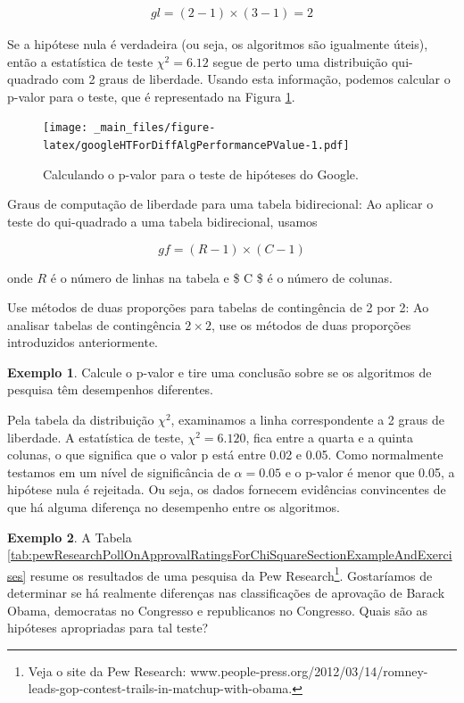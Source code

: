 \documentclass[
]{book}
\theoremstyle{definition}
\theoremstyle{definition}
\newtheorem{example}{Exemplo}[chapter]
\theoremstyle{definition}
\theoremstyle{definition}
\theoremstyle{remark}
\begin{document}
\begin{align*}
gl = (2-1)\times (3-1) = 2
\end{align*}

Se a hipótese nula é verdadeira (ou seja, os algoritmos são igualmente úteis), então a estatística de teste \(\chi^2 = 6.12\) segue de perto uma distribuição qui-quadrado com 2 graus de liberdade. Usando esta informação, podemos calcular o p-valor para o teste, que é representado na Figura \ref{fig:googleHTForDiffAlgPerformancePValue}.

\begin{figure}
\centering
\texttt{[image: \_main\_files/figure-latex/googleHTForDiffAlgPerformancePValue-1.pdf]}
\caption{\label{fig:googleHTForDiffAlgPerformancePValue}Calculando o p-valor para o teste de hipóteses do Google.}
\end{figure}

Graus de computação de liberdade para uma tabela bidirecional: Ao aplicar o teste do qui-quadrado a uma tabela bidirecional, usamos

\[gf = (R-1)\times (C-1)\]

onde \(R\) é o número de linhas na tabela e \$ C \$ é o número de colunas.

Use métodos de duas proporções para tabelas de contingência de 2 por 2: Ao analisar tabelas de contingência \(2\times 2\), use os métodos de duas proporções introduzidos anteriormente.

\begin{example}
\protect\hypertarget{exm:unnamed-chunk-252}{}{\label{exm:unnamed-chunk-252} }Calcule o p-valor e tire uma conclusão sobre se os algoritmos de pesquisa têm desempenhos diferentes.
\end{example}

Pela tabela da distribuição \(\chi^2\), examinamos a linha correspondente a 2 graus de liberdade. A estatística de teste, \(\chi^2 = 6.120\), fica entre a quarta e a quinta colunas, o que significa que o valor p está entre 0.02 e 0.05. Como normalmente testamos em um nível de significância de \(\alpha = 0.05\) e o p-valor é menor que 0.05, a hipótese nula é rejeitada. Ou seja, os dados fornecem evidências convincentes de que há alguma diferença no desempenho entre os algoritmos.

\begin{example}
\protect\hypertarget{exm:hypothesisTestSetupForPewResearchPollOnApprovalRatingsForChiSquareSection}{}{\label{exm:hypothesisTestSetupForPewResearchPollOnApprovalRatingsForChiSquareSection} }A Tabela \ref{tab:pewResearchPollOnApprovalRatingsForChiSquareSectionExampleAndExercises} resume os resultados de uma pesquisa da Pew Research\footnote{Veja o site da Pew Research: www.people-press.org/2012/03/14/romney-leads-gop-contest-trails-in-matchup-with-obama.}. Gostaríamos de determinar se há realmente diferenças nas classificações de aprovação de Barack Obama, democratas no Congresso e republicanos no Congresso. Quais são as hipóteses apropriadas para tal teste?
\end{example}
\end{document}
